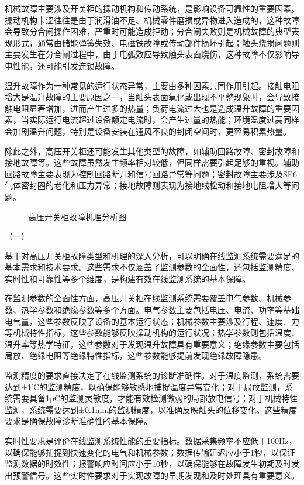 机械故障主要涉及开关柜的操动机构和传动系统，是影响设备可靠性的重要因素。操动机构卡涩往往是由于润滑油不足、机械零件磨损或异物进入造成的，这种故障会导致分合闸操作困难，严重时可能造成拒动；分合闸失败则是机械故障的典型表现形式，通常由储能弹簧失效、电磁铁故障或传动部件损坏引起；触头烧损问题则主要发生在分合闸过程中，由于电弧效应导致触头表面烧伤，这种故障不仅影响导电性能，还可能引发连锁故障。

温升故障作为一种常见的运行状态异常，主要由多种因素共同作用引起。接触电阻增大是温升故障的主要原因之一，当触头表面氧化或出现不平整现象时，会导致接触电阻显著增加，进而产生过多的热量；负荷电流过大也是造成温升故障的重要因素，当实际运行电流超过设备额定电流时，会产生过量的热能；环境温度过高同样会加剧温升问题，特别是设备安装在通风不良的封闭空间时，更容易积累热量。

除此之外，高压开关柜还可能发生其他类型的故障，如辅助回路故障、密封故障和接地故障等。这些故障虽然发生频率相对较低，但同样需要引起足够的重视。辅助回路故障主要表现为控制回路断开和信号回路异常等问题；密封故障主要涉及SF6气体密封圈的老化和压力异常；接地故障则表现为接地线松动和接地电阻增大等问题。

\begin{figure}[h]
\centering
\caption{高压开关柜故障机理分析图}
\label{fig:fault_mechanism}
\end{figure}

（一）

基于对高压开关柜故障类型和机理的深入分析，可以明确在线监测系统需要满足的基本需求和技术要求。这些需求不仅涵盖了监测参数的全面性，还包括监测精度、实时性和可靠性等多个维度，是构建有效在线监测系统的基本保障。

在监测参数的全面性方面，高压开关柜在线监测系统需要覆盖电气参数、机械参数、热学参数和绝缘参数等多个方面。电气参数主要包括电压、电流、功率等基础电气量，这些参数反映了设备的基本运行状态；机械参数主要涉及行程、速度、力等机械特性指标，这些参数能够反映操动机构的运行状况；热学参数则包括温度、温升率等热学特征，这些参数对于发现温升故障具有重要意义；绝缘参数主要包括局放、绝缘电阻等绝缘特性指标，这些参数能够提前发现绝缘故障隐患。

监测精度的要求直接决定了在线监测系统的诊断准确性。对于温度监测，系统需要达到±1℃的监测精度，以确保能够敏感地捕捉温度异常变化；对于局放监测，系统需要具备1pC的监测灵敏度，才能有效检测微弱的局部放电信号；对于机械特性监测，系统需要达到±0.1mm的监测精度，以准确反映触头的位移变化。这些精度要求是确保故障诊断准确性的基本保障。

实时性要求是评价在线监测系统性能的重要指标。数据采集频率不应低于100Hz，以确保能够捕捉到快速变化的电气和机械参数；数据传输延迟应小于1秒，以保证监测数据的时效性；报警响应时间应小于10秒，以确保能够在故障发生初期及时发出预警信号。这些实时性要求对于实现故障的早期发现和及时处理具有重要意义。

